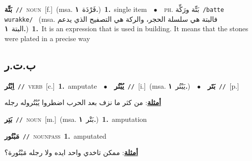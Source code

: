 \documentclass[10pt,a4paper,twoside]{article} %
\begin{document}
\begin{multicols}{2}
{{\setlength\topsep{0pt}\textbf{\foreignlanguage{arabic}{بَتِّة}}\ {\color{gray}\texttt{//}\color{black}}\ \textsc{noun}\ [f.]\ \color{gray}(msa. \foreignlanguage{arabic}{فَرْدَة}~\foreignlanguage{arabic}{\textbf{١.}})\color{black}\ \textbf{1.}~single item\ \ $\bullet$\ \ \textsc{ph.} \color{gray} \foreignlanguage{arabic}{بَتِّة ورَكِّة}\color{black}\ {\color{gray}\texttt{/{\sffamily batte wurakke}/}\color{black}}\ \color{gray} (msa. \foreignlanguage{arabic}{فالبتة هي سلسلة الحجر، والركة هي التصفيح الذي يدعم البتة}~\foreignlanguage{arabic}{\textbf{١.}})\color{black}\ \textbf{1.}~It is an expression that is used in building. It means that the stones were plated in a precise way\ 

\vspace{-3mm}
\subsection*{\color{blue}\foreignlanguage{arabic}{ب.ت.ر}\color{blue}{}} 

{\setlength\topsep{0pt}\textbf{\foreignlanguage{arabic}{اِبْتُر}}\ {\color{gray}\texttt{//}\color{black}}\ \textsc{verb}\ [c.]\ \textbf{1.}~amputate\ \ $\bullet$\ \ \setlength\topsep{0pt}\textbf{\foreignlanguage{arabic}{يُبْتُر}}\ {\color{gray}\texttt{//}\color{black}}\ [i.]\ \color{gray}(msa. \foreignlanguage{arabic}{يَبْتُر}~\foreignlanguage{arabic}{\textbf{١.}})\color{black}\ \ $\bullet$\ \ \setlength\topsep{0pt}\textbf{\foreignlanguage{arabic}{بَتَر}}\ {\color{gray}\texttt{//}\color{black}}\ [p.]\  \begin{flushright}\color{gray}\foreignlanguage{arabic}{\textbf{\underline{\foreignlanguage{arabic}{أمثلة}}}: من كثر ما نزف بعد الحرب اضطروا يُبْتُروله رجله}\end{flushright}\color{black}} \vspace{2mm}

{\setlength\topsep{0pt}\textbf{\foreignlanguage{arabic}{بَتِر}}\ {\color{gray}\texttt{//}\color{black}}\ \textsc{noun}\ [m.]\ \color{gray}(msa. \foreignlanguage{arabic}{بَتْر}~\foreignlanguage{arabic}{\textbf{١.}})\color{black}\ \textbf{1.}~amputation\ 

{\setlength\topsep{0pt}\textbf{\foreignlanguage{arabic}{مَبْتُور}}\ {\color{gray}\texttt{//}\color{black}}\ \textsc{noun\textunderscore pass}\ \textbf{1.}~amputated\  \begin{flushright}\color{gray}\foreignlanguage{arabic}{\textbf{\underline{\foreignlanguage{arabic}{أمثلة}}}: ممكن تاخدي واحد ايده ولا رجله مَبْتُورة؟}\end{flushright}\color{black}} \vspace{2mm}

}}}
\end{multicols}
\end{document}
